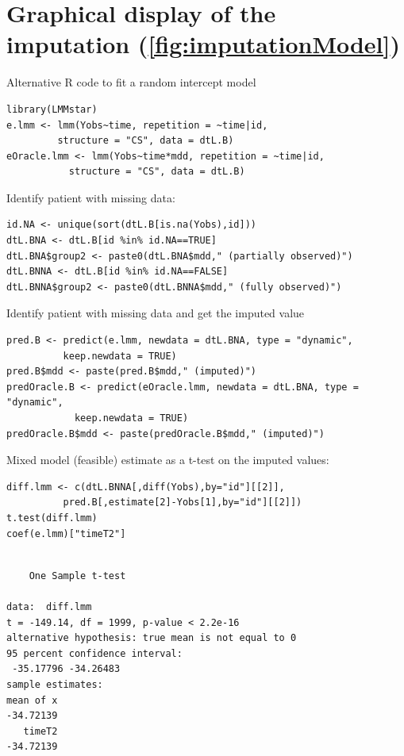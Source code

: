 \documentclass[12pt]{article}
\begin{document}
\renewcommand{\thefigure}{\Alph{figure}}
\renewcommand{\thetable}{\Alph{table}}
\renewcommand{\theequation}{\Alph{equation}}

\setcounter{figure}{0}    
\setcounter{table}{0}    
\setcounter{equation}{0}    

\clearpage

\section{Graphical display of the imputation (\autoref{fig:imputationModel})}
\label{SM:imputation}
Alternative R code to fit a random intercept model
\lstset{language=r,label= ,caption= ,captionpos=b,numbers=none}
\begin{lstlisting}
library(LMMstar)
e.lmm <- lmm(Yobs~time, repetition = ~time|id,
	     structure = "CS", data = dtL.B)
eOracle.lmm <- lmm(Yobs~time*mdd, repetition = ~time|id,
		   structure = "CS", data = dtL.B)
\end{lstlisting}

Identify patient with missing data:
\lstset{language=r,label= ,caption= ,captionpos=b,numbers=none}
\begin{lstlisting}
id.NA <- unique(sort(dtL.B[is.na(Yobs),id]))
dtL.BNA <- dtL.B[id %in% id.NA==TRUE]
dtL.BNA$group2 <- paste0(dtL.BNA$mdd," (partially observed)")
dtL.BNNA <- dtL.B[id %in% id.NA==FALSE]
dtL.BNNA$group2 <- paste0(dtL.BNNA$mdd," (fully observed)")
\end{lstlisting}

Identify patient with missing data and get the imputed value
\lstset{language=r,label= ,caption= ,captionpos=b,numbers=none}
\begin{lstlisting}
pred.B <- predict(e.lmm, newdata = dtL.BNA, type = "dynamic",
		  keep.newdata = TRUE)
pred.B$mdd <- paste(pred.B$mdd," (imputed)")
predOracle.B <- predict(eOracle.lmm, newdata = dtL.BNA, type = "dynamic",
			keep.newdata = TRUE)
predOracle.B$mdd <- paste(predOracle.B$mdd," (imputed)")
\end{lstlisting}

Mixed model (feasible) estimate as a t-test on the imputed values:
\lstset{language=r,label= ,caption= ,captionpos=b,numbers=none}
\begin{lstlisting}
diff.lmm <- c(dtL.BNNA[,diff(Yobs),by="id"][[2]],
	      pred.B[,estimate[2]-Yobs[1],by="id"][[2]])
t.test(diff.lmm)
coef(e.lmm)["timeT2"]
\end{lstlisting}

\begin{verbatim}

	One Sample t-test

data:  diff.lmm
t = -149.14, df = 1999, p-value < 2.2e-16
alternative hypothesis: true mean is not equal to 0
95 percent confidence interval:
 -35.17796 -34.26483
sample estimates:
mean of x 
-34.72139
   timeT2 
-34.72139
\end{verbatim}
\end{document}
